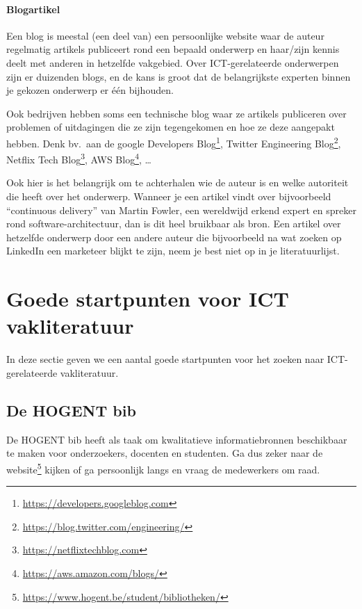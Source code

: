 \paragraph{Blogartikel}

Een blog is meestal (een deel van) een persoonlijke website waar de auteur regelmatig artikels publiceert rond een bepaald onderwerp en haar/zijn kennis deelt met anderen in hetzelfde vakgebied. Over ICT-gerelateerde onderwerpen zijn er duizenden blogs, en de kans is groot dat de belangrijkste experten binnen je gekozen onderwerp er één bijhouden.

Ook bedrijven hebben soms een technische blog waar ze artikels publiceren over problemen of uitdagingen die ze zijn tegengekomen en hoe ze deze aangepakt hebben. Denk bv.\ aan de google Developers Blog\footnote{\url{https://developers.googleblog.com}}, Twitter Engineering Blog\footnote{\url{https://blog.twitter.com/engineering/}}, Netflix Tech Blog\footnote{\url{https://netflixtechblog.com}}, AWS Blog\footnote{\url{https://aws.amazon.com/blogs/}}, \dots

Ook hier is het belangrijk om te achterhalen wie de auteur is en welke autoriteit die heeft over het onderwerp. Wanneer je een artikel vindt over bijvoorbeeld ``continuous delivery'' van Martin Fowler, een wereldwijd erkend expert en spreker rond software-architectuur, dan is dit heel bruikbaar als bron. Een artikel over hetzelfde onderwerp door een andere auteur die bijvoorbeeld na wat zoeken op LinkedIn een marketeer blijkt te zijn, neem je best niet op in je literatuurlijst.

\section{Goede startpunten voor ICT vakliteratuur}%
\label{sec:startpunten-ict-vakliteratuur}

In deze sectie geven we een aantal goede startpunten voor het zoeken naar ICT-gerelateerde vakliteratuur.

\subsection{De HOGENT bib}%
\label{ssec:hogent-bib}

De HOGENT bib heeft als taak om kwalitatieve informatiebronnen beschikbaar te maken voor onderzoekers, docenten en studenten. Ga dus zeker naar de website\footnote{\url{https://www.hogent.be/student/bibliotheken/}} kijken of ga persoonlijk langs en vraag de medewerkers om raad.

